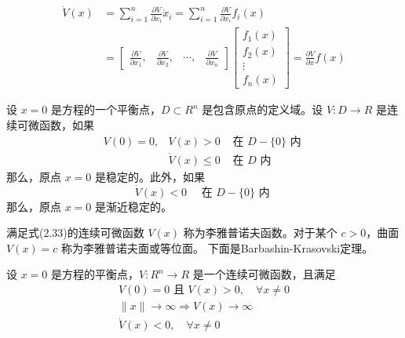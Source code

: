 \begin{equation}
    \begin{aligned}
    \dot{V}(x) & =\sum_{i=1}^n \frac{\partial V}{\partial x_i} \dot{x}_i=\sum_{i=1}^n \frac{\partial V}{\partial x_i} f_i(x) \\
    & =\left[\begin{array}{llll}
    \frac{\partial V}{\partial x_1},& \frac{\partial V}{\partial x_2},& \cdots,& \frac{\partial V}{\partial x_n}
    \end{array}\right]\left[\begin{array}{c}
    f_1(x) \\
    f_2(x) \\
    \vdots \\
    f_n(x)
    \end{array}\right]=\frac{\partial V}{\partial x} f(x)
    \end{aligned}
\end{equation}
\begin{theorem}
    设 $x=0$ 是方程的一个平衡点，$D \subset R^n$ 是包含原点的定义域。设 $V: D \rightarrow R$ 是连续可微函数，如果
    \begin{equation}
        \begin{array}{lll}
        V(0)=0,& V(x)>0 & \text { 在 } D-\{0\} \text { 内 } \\
        & \dot{V}(x) \leqslant 0 & \text { 在 } D \text { 内 }
        \end{array}
    \end{equation}
    那么，原点 $x=0$ 是稳定的。此外，如果
    \begin{equation}
        \dot{V}(x)<0 \quad \text { 在 } D-\{0\} \text { 内 }
    \end{equation}
    那么，原点 $x=0$ 是渐近稳定的。
\end{theorem}
满足式(2.33)的连续可微函数 $V(x)$ 称为李雅普诺夫函数。对于某个 $c>0$，曲面 $V(x)=c$ 称为李雅普诺夫面或等位面。
下面是Barbashin-Krasovski定理。 
\begin{theorem}
    设 $x=0$ 是方程的平衡点，$V: R^n \rightarrow R$ 是一个连续可微函数，且满足
    \begin{equation}
        \begin{gathered}
        V(0)=0 \text { 且 } V(x)>0,\quad \forall x \neq 0 \\
        \|x\| \rightarrow \infty \Rightarrow V(x) \rightarrow \infty \\
        \dot{V}(x)<0,\quad \forall x \neq 0
        \end{gathered}
     \end{equation}
\end{theorem}
